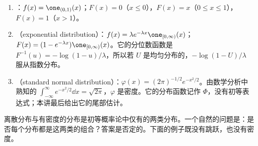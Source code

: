 \begin{example}[三个重要的密度]\label{ex:distributions:densities}
\begin{enumerate}
\item {}：$f(x)=\one_{(0,1)}(x)$；$F(x)=0$（$x\leqslant0$），$F(x)=x$（$0\leqslant x\leqslant1$），$F(x)=1$（$x>1$）。
\item {}（exponential distribution）：$f(x)=\lambda e^{-\lambda x}\one_{[0,\infty)}(x)$；$F(x)=(1-e^{-\lambda x})\one_{[0,\infty)}(x)$。它的分位数函数是 $F^{-1}(u)=-\log(1-u)/\lambda$，所以若 $U$ 是均匀分布的，$-\log(1-U)/\lambda$ 服从指数分布。
\item {}（standard normal distribution）：$\varphi(x)=(2\pi)^{-1/2}e^{-x^2/2}$。由数学分析中熟知的 $\int_{-\infty}^\infty e^{-x^2/2}\dd x=\sqrt{2\pi}$，$\varphi$ 是密度。它的分布函数记作 $\Phi$，没有初等表达式；本讲最后给出它的尾部估计。
\end{enumerate}
\end{example}

离散分布与有密度的分布是初等概率论中仅有的两类分布。一个自然的问题是：是否每个分布都是这两类的组合？答案是否定的。下面的例子既没有跳跃，也没有密度。

